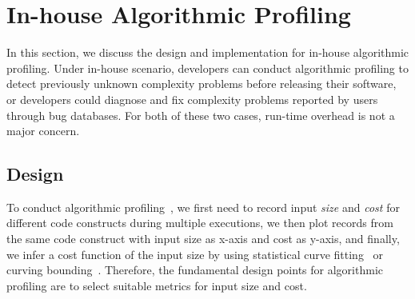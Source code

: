 \section{In-house Algorithmic Profiling}
\label{sec:inhouse}

In this section, we discuss the design and implementation for in-house algorithmic profiling.
Under in-house scenario, 
developers can conduct algorithmic profiling 
to detect previously unknown complexity problems before releasing their software, 
or developers could diagnose and fix complexity problems reported by users through bug databases.
For both of these two cases, 
run-time overhead is not a major concern. 

\subsection{Design}
To conduct algorithmic profiling~\cite{Aprof1,Aprof2,AlgoProf},
we first need to record input \textit{size} and \textit{cost} for different code constructs 
during multiple executions,
we then plot records from the same code construct with input size as x-axis and cost as y-axis, 
and finally, we infer a cost function of the input size by using 
statistical curve fitting~\cite{curve-fitting} 
or curving bounding~\cite{curve-bounding}. 
Therefore, the fundamental design points for algorithmic 
profiling are to select suitable metrics for input size and cost. 


